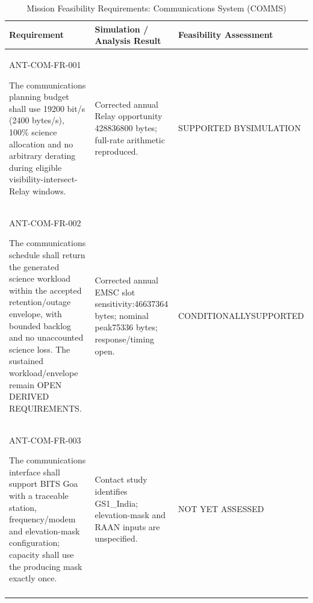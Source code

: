 \begin{table}[H]\centering\small\setlength{\tabcolsep}{3pt}
\caption{Mission Feasibility Requirements: Communications System (COMMS)}\label{tab:fr-com}
\begin{tabular}{@{}
>{\RaggedRight\arraybackslash}p{}
>{\RaggedRight\arraybackslash}p{}
>{\RaggedRight\arraybackslash}p{}
@{}}
\toprule Requirement & Simulation / Analysis Result & Feasibility Assessment\\\midrule
{}\label{req:ANT-COM-FR-001}\mbox{ANT-COM-}\newline\mbox{FR-001}\par The communications planning budget shall use 19200 bit/s (2400 bytes/s), 100\% science allocation and no arbitrary derating during eligible visibility-intersect-Relay windows. & Corrected annual Relay opportunity 428836800 bytes; full-rate arithmetic reproduced. & SUPPORTED BY\newline SIMULATION\\
\addlinespace[3pt]
\label{req:ANT-COM-FR-002}\mbox{ANT-COM-}\newline\mbox{FR-002}\par The communications schedule shall return the generated science workload within the accepted retention/outage envelope, with bounded backlog and no unaccounted science loss. The sustained workload/envelope remain OPEN DERIVED REQUIREMENTS. & Corrected annual EMSC slot sensitivity:46637364 bytes; nominal peak75336 bytes; response/timing open. & CONDITIONALLY\newline SUPPORTED\\
\addlinespace[3pt]
\label{req:ANT-COM-FR-003}\mbox{ANT-COM-}\newline\mbox{FR-003}\par The communications interface shall support BITS Goa with a traceable station, frequency/modem and elevation-mask configuration; capacity shall use the producing mask exactly once. & Contact study identifies GS1\_India; elevation-mask and RAAN inputs are unspecified. & NOT YET ASSESSED\\
\addlinespace[3pt]
\bottomrule
\end{tabular}
\end{table}
